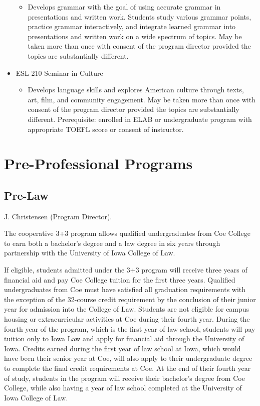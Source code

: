 \documentclass[
  letterpaper,
]{scrbook}
\providecommand{\tightlist}{%
  \setlength{\itemsep}{0pt}\setlength{\parskip}{0pt}}
\begin{document}
\begin{itemize}
  \begin{itemize}
  \tightlist
  \item
    Develops grammar with the goal of using accurate grammar in
    presentations and written work. Students study various grammar
    points, practice grammar interactively, and integrate learned
    grammar into presentations and written work on a wide spectrum of
    topics. May be taken more than once with consent of the program
    director provided the topics are substantially different.
  \end{itemize}
\item
  ESL 210 Seminar in Culture

  \begin{itemize}
  \tightlist
  \item
    Develops language skills and explores American culture through
    texts, art, film, and community engagement. May be taken more than
    once with consent of the program director provided the topics are
    substantially different. Prerequisite: enrolled in ELAB or
    undergraduate program with appropriate TOEFL score or consent of
    instructor.
  \end{itemize}
\end{itemize}

\hypertarget{pre-professional-programs}{%
\section{Pre-Professional Programs}\label{pre-professional-programs}}

\hypertarget{pre-law}{%
\subsection{Pre-Law}\label{pre-law}}

J. Christensen (Program Director).

The cooperative 3+3 program allows qualified undergraduates from Coe
College to earn both a bachelor's degree and a law degree in six years
through partnership with the University of Iowa College of Law.

If eligible, students admitted under the 3+3 program will receive three
years of financial aid and pay Coe College tuition for the first three
years. Qualified undergraduates from Coe must have satisfied all
graduation requirements with the exception of the 32-course credit
requirement by the conclusion of their junior year for admission into
the College of Law. Students are not eligible for campus housing or
extracurricular activities at Coe during their fourth year. During the
fourth year of the program, which is the first year of law school,
students will pay tuition only to Iowa Law and apply for financial aid
through the University of Iowa. Credits earned during the first year of
law school at Iowa, which would have been their senior year at Coe, will
also apply to their undergraduate degree to complete the final credit
requirements at Coe. At the end of their fourth year of study, students
in the program will receive their bachelor's degree from Coe College,
while also having a year of law school completed at the University of
Iowa College of Law.
\end{document}
